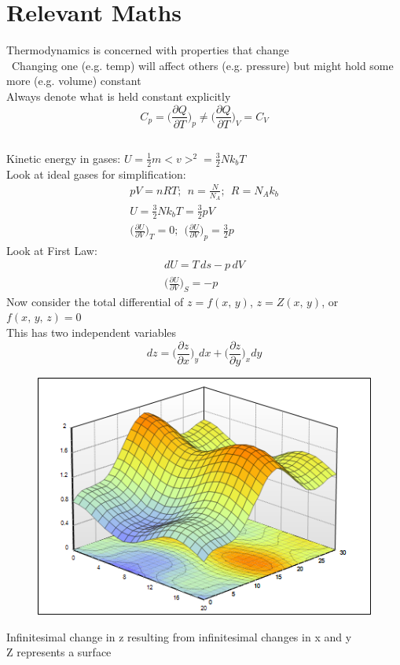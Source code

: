 \documentclass[a4paper, 11pt, normalem]{report}
\newcommand\p{\partial}
\begin{document}
\section{Relevant Maths}
Thermodynamics is concerned with properties that change \\\
Changing one (e.g. temp) will affect others (e.g. pressure) but might hold some more (e.g. volume) constant \\
Always denote what is held constant explicitly
\begin{equation*}
    C_p = \Big(\frac{\p Q}{\p T}\Big)_p \neq \Big(\frac{\p Q}{\p T}\Big)_V = C_V
\end{equation*}

\subsection{}
Kinetic energy in gases: $U = \frac{1}{2}m<v>^2 = \frac{3}{2}Nk_{b}T$ \\
Look at ideal gases for simplification:
\begin{gather*}
    pV = nRT;~~ n = \frac{N}{N_{A}};~~ R = N_{A}k_{b} \\
    U = \frac{3}{2}Nk_{b}T = \frac{3}{2}pV \\
    \Big(\frac{\p U}{\p V}\Big)_T = 0;~~ \Big(\frac{\p U}{\p V}\Big)_p = \frac{3}{2}p
\end{gather*}
Look at First Law:
\begin{gather*}
    dU = T\,ds - p\,dV \\
    \Big(\frac{\p U}{\p V}\Big)_S = -p
\end{gather*}
Now consider the total differential of $z = f(x,\,y)$, $z = Z(x,\,y)$, or $f(x,\,y,\,z) = 0$ \\
This has two independent variables
\begin{equation*}
    dz = \Big(\frac{\p z}{\p x}\Big)_y dx + \Big(\frac{\p z}{\p y}\Big)_x dy
\end{equation*}
\newpage
\begin{figure}
    \begin{center}
        \includegraphics[scale=0.35]{Surface.png}
    \end{center}
\end{figure}
Infinitesimal change in z resulting from infinitesimal changes in x and y \\
Z represents a surface
\end{document}
